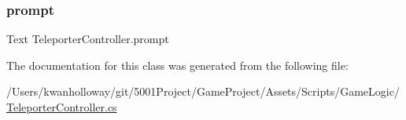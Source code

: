\subsubsection{\texorpdfstring{prompt}{prompt}}
{\footnotesize\ttfamily Text Teleporter\+Controller.\+prompt}



The documentation for this class was generated from the following file\+:\begin{DoxyCompactItemize}
\item 
/\+Users/kwanholloway/git/5001\+Project/\+Game\+Project/\+Assets/\+Scripts/\+Game\+Logic/\hyperlink{_teleporter_controller_8cs}{Teleporter\+Controller.\+cs}\end{DoxyCompactItemize}
